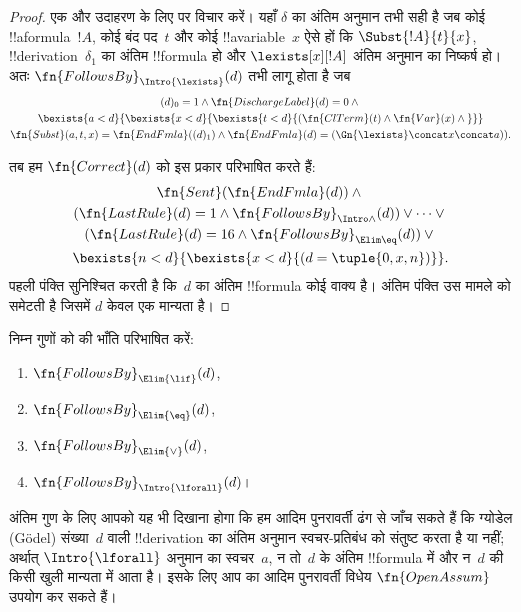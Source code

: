 \documentclass[../../../include/open-logic-section]{subfiles}
\begin{document}
\begin{proof}
  एक और उदाहरण के लिए \Intro{\lexists} पर विचार करें। यहाँ $\delta$ का
  अंतिम अनुमान तभी सही है जब कोई !!a{formula}~$!A$, कोई बंद पद~$t$ और कोई
  !!a{variable}~$x$ ऐसे हों कि $\Subst{!A}{t}{x}$,
  !!{derivation}~$\delta_1$ का अंतिम !!{formula} हो और
  $\lexists[x][!A]$ अंतिम अनुमान का निष्कर्ष हो। अतः
  $\fn{FollowsBy}_{\Intro{\lexists}}(d)$ तभी लागू होता है जब
  \begin{multline*}
    (d)_0 = 1 \land \fn{DischargeLabel}(d) = 0 \land {} \\
    \bexists{a < d}{\bexists{x<d}{\bexists{t<d}{
          (\fn{ClTerm}(t) \land \fn{Var}(x)  \land {}}}}\\
    \fn{Subst}(a,t,x) = \fn{EndFmla}((d)_1) \land
    \fn{EndFmla}(d) = (\Gn{\lexists} \concat x \concat a)).
  \end{multline*}

  तब हम $\fn{Correct}(d)$ को इस प्रकार परिभाषित करते हैं:
  \begin{multline*}
    \fn{Sent}(\fn{EndFmla}(d)) \land {}\\
    (\fn{LastRule}(d) = 1 \land
    \fn{FollowsBy}_{\Intro\land}(d)) \lor \dots \lor {}\\
    (\fn{LastRule}(d) = 16 \land \fn{FollowsBy}_{\Elim\eq}(d)) \lor {}\\
    \bexists{n<d}{\bexists{x<d}{(d = \tuple{0, x, n})}}.
  \end{multline*}
  पहली पंक्ति सुनिश्चित करती है कि~$d$ का अंतिम !!{formula} कोई वाक्य है।
  अंतिम पंक्ति उस मामले को समेटती है जिसमें $d$ केवल एक मान्यता है।
\end{proof}

\begin{prob}
  निम्न गुणों को  की भाँति परिभाषित
  करें:
  \begin{enumerate}
  \item $\fn{FollowsBy}_{\Elim{\lif}}(d)$,
  \item $\fn{FollowsBy}_{\Elim{\eq}}(d)$,
  \item $\fn{FollowsBy}_{\Elim{\lor}}(d)$,
  \item $\fn{FollowsBy}_{\Intro{\lforall}}(d)$।
  \end{enumerate}
  अंतिम गुण के लिए आपको यह भी दिखाना होगा कि हम आदिम पुनरावर्ती ढंग से
  जाँच सकते हैं कि ग्योडेल (G\"odel) संख्या~$d$ वाली !!{derivation} का अंतिम
  अनुमान स्वचर-प्रतिबंध को संतुष्ट करता है या नहीं; अर्थात्
  $\Intro{\lforall}$ अनुमान का स्वचर~$a$, न तो~$d$ के अंतिम !!{formula} में
  और न~$d$ की किसी खुली मान्यता में आता है। इसके लिए आप
   का आदिम पुनरावर्ती विधेय
  $\fn{OpenAssum}$ उपयोग कर सकते हैं।
\end{prob}
\end{document}
